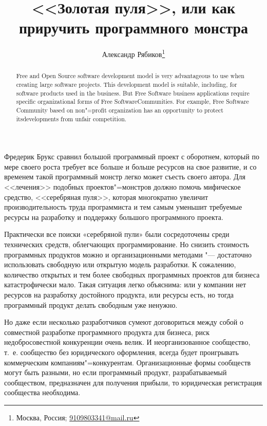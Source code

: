 \documentclass[10pt, a5paper]{article}
\begin{document}
\title{<<Золотая пуля>>, или как приручить программного монстра}%

\author{Александр Рябиков\footnote{Москва, Россия; \url{9109803341@mail.ru}}}
\maketitle

\begin{abstract}
Free and Open Source software development model is very advantageous to use when creating large software projects. This development model is suitable, including, for software products used in the business. But Free Software business applications require specific organizational forms of Free Software\linebreak Communities. For example, Free Software Community based on non"=profit organization has an opportunity to protect its\linebreak developments from unfair competition.
\end{abstract}

Фредерик Брукс сравнил большой программный проект с оборотнем, который по мере своего роста требует все больше и больше ресурсов на свое развитие, и со временем такой программный монстр легко может съесть своего автора. Для <<лечения>> подобных проектов"=монстров должно помочь мифическое средство, <<серебряная пуля>>, которая многократно увеличит производительность труда программиста и тем самым уменьшит требуемые ресурсы на разработку и поддержку большого программного проекта.

Практически все поиски «серебряной пули» были сосредоточены среди технических средств, облегчающих программирование. Но снизить стоимость программных продуктов можно и организационными методами "--- достаточно использовать свободную или открытую модель разработки. К сожалению, количество открытых и тем более свободных программных проектов для бизнеса катастрофически мало. Такая ситуация легко объяснима: или у компании нет ресурсов на разработку достойного продукта, или ресурсы есть, но тогда программный продукт делать свободным уже ненужно.

Но даже если несколько разработчиков сумеют договориться между собой о совместной разработке программного продукта для бизнеса, риск недобросовестной конкуренции очень велик. И неорганизованное сообщество, т.~е. сообщество без юридического оформления, всегда будет проигрывать коммерческим компаниям"=конкурентам. Организационные формы сообществ могут быть разными, но если программный продукт, разрабатываемый сообществом, предназначен для получения прибыли, то юридическая регистрация сообщества необходима.
\end{document}
